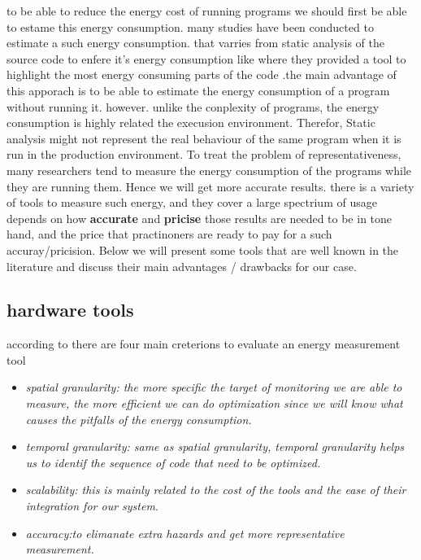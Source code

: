 to be able to reduce the energy cost of running programs we should first be able to estame this energy consumption.
many studies have been conducted to estimate a such energy consumption. that varries from static analysis of the source code to enfere it's energy consumption like \citeauthor{pereira_helping_2017} where they provided a tool to highlight the most energy consuming parts of the code \cite{pereira_helping_2017}.the main advantage of this apporach is to be able to estimate the energy consumption of a program without running it. however. unlike the conplexity of programs, the energy consumption is highly related the execusion environment. Therefor, Static analysis might not represent the real behaviour of the same program when it is run in the production environment.
To treat the problem of representativeness, many researchers tend to measure the energy consumption of the programs while they are running them. Hence we will get more accurate results.
there is a variety of tools to measure such energy, and they cover a large spectrium of usage depends on how \textbf{accurate} and \textbf{pricise} those results are needed to be in tone hand, and the price that practinoners are ready to pay for a such accuray/pricision.
Below we will present some tools that are well known in the literature and discuss their main advantages / drawbacks for our case.
\subsection{hardware tools}


according to \citeauthor{hackenberg2014hdeem} there are four main creterions to evaluate an energy measurement tool \cite{hackenberg2014hdeem}
\begin{itemize}
    \item \em{spatial granularity}: the more specific the target of monitoring we are able to measure, the more efficient we can do optimization since we will know what causes the pitfalls of the energy consumption.
    \item \em{temporal granularity}: same as spatial granularity, temporal granularity helps us to identif the sequence of code that need to be optimized.
    \item \em{scalability}: this is mainly related to the cost of the tools and the ease of their integration for our system.
    \item  \em{accuracy}:to elimanate extra hazards and get more representative measurement.
\end{itemize}

